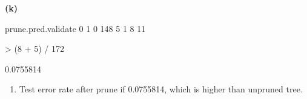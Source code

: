 \documentclass[a4paper]{article}
\renewcommand{\part}[1] {\vspace{.10in} {\bf (#1)}}
\begin{document}
\part{k}
\begin{Schunk}
\begin{Soutput}
prune.pred.validate   0   1
                  0 148   5
                  1   8  11
\end{Soutput}
\begin{Sinput}
> (8 + 5) / 172
\end{Sinput}
\begin{Soutput}
[1] 0.0755814
\end{Soutput}
\end{Schunk}
{\color{red}
\begin{enumerate}
\item Test error rate after prune if 0.0755814, which is higher than unpruned tree.
\end{enumerate}
}
\end{document}
